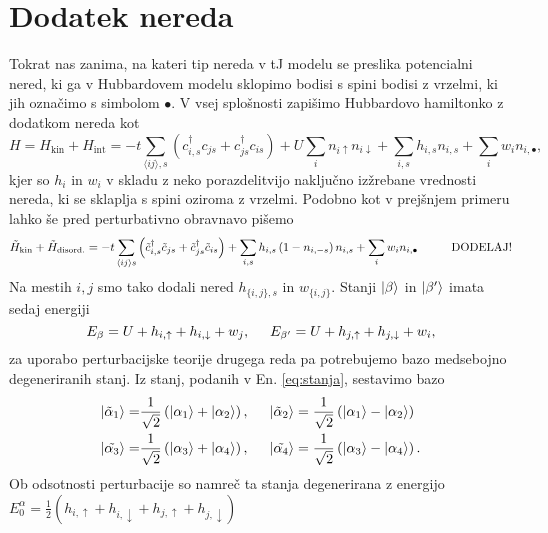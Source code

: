 \documentclass[10pt,a4paper]{article}
\begin{document}
\section{Dodatek nereda}
Tokrat nas zanima, na kateri tip nereda v tJ modelu se preslika potencialni nered, ki ga v Hubbardovem modelu sklopimo bodisi s spini bodisi z vrzelmi, ki jih označimo s simbolom $\bullet$. V vsej splošnosti zapišimo Hubbardovo hamiltonko z dodatkom nereda kot 
\begin{equation}
H=H_\mathrm{kin} + H_\mathrm{int}=-t\sum\limits_{\langle ij \rangle, s}\left(c^\dagger_{i,s} c_{js} + c^\dagger_{js}c_{is}\right) + U\sum_i n_{i\uparrow}n_{i\downarrow} + \sum\limits_{i,s} h_{i,s} n_{i, s} + \sum\limits_i w_i n_{i,\bullet}, 
\end{equation}
kjer so $h_i$ in $w_i$ v skladu z neko porazdelitvijo naključno izžrebane vrednosti nereda, ki se sklaplja s spini oziroma z vrzelmi. Podobno kot v prejšnjem primeru lahko še pred perturbativno obravnavo pišemo 
\begin{equation}
\tilde{H}_\mathrm{kin} + \tilde{H}_\mathrm{disord.} = -t\sum\limits_{\langle ij \rangle s} \left(\tilde{c}^\dagger_{i,s} \tilde{c}_{js} + \tilde{c}^\dagger_{js}\tilde{c}_{is}\right) +\sum\limits_{i,s} h_{i,s} \left(1-n_{i,-s}\right)n_{i,s} + \sum\limits_{i} w_i n_{i,\bullet} \hspace{10mm} \mathrm{DODELAJ!}
\end{equation}
Na mestih $i, j$ smo tako dodali nered $h_{\{i,j\},s}$ in $w_{\{i,j\}}$. Stanji $\vert\beta\rangle$ in $\vert\beta'\rangle$ imata sedaj energiji 
\begin{equation}
E_\beta = U + h_{i,\uparrow} + h_{i,\downarrow} + w_j, \hspace{5mm} E_{\beta'}= U + h_{j, \uparrow} + h_{j,\downarrow} + w_i, 
\end{equation}
za uporabo perturbacijske teorije drugega reda pa potrebujemo bazo medsebojno degeneriranih stanj. Iz stanj, podanih v En. \eqref{eq:stanja}, sestavimo bazo 
\begin{equation}
\begin{split}
\vert\tilde{\alpha}_1\rangle=&\frac{1}{\sqrt{2}}\left( \vert\alpha_1 \rangle + \vert\alpha_2\rangle\right), \hspace{5mm} \vert\tilde{\alpha}_2\rangle= \frac{1}{\sqrt{2}}\left(\vert\alpha_1 \rangle - \vert\alpha_2\rangle\right)\\
\vert\tilde{\alpha_3}\rangle=&\frac{1}{\sqrt{2}}\left( \vert\alpha_3\rangle + \vert\alpha_4\rangle\right), \hspace{ 5mm}\vert\tilde{\alpha_4}\rangle=\frac{1}{\sqrt{2}}\left(\vert\alpha_3\rangle - \vert\alpha_4\rangle\right).
\end{split}
\end{equation}
Ob odsotnosti perturbacije so namreč ta stanja degenerirana z energijo $E_0^\alpha= \frac{1}{2} \left(h_{i,\uparrow} + h_{i,\downarrow} + h_{j,\uparrow} + h_{j,\downarrow}\right)$
\end{document}

